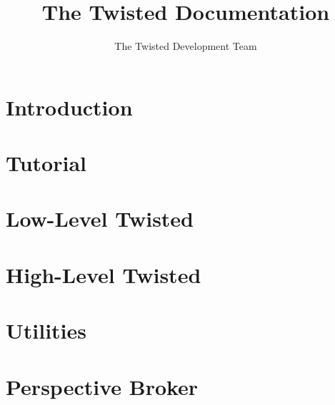 \documentclass[oneside]{book}
\title{The Twisted Documentation}
\author{The Twisted Development Team}
\begin{document}
\maketitle
\tableofcontents

\chapter{Introduction}







\chapter{Tutorial}














\chapter{Low-Level Twisted }












\chapter{High-Level Twisted}









\chapter{Utilities}







\chapter{Perspective Broker}





\end{document}
